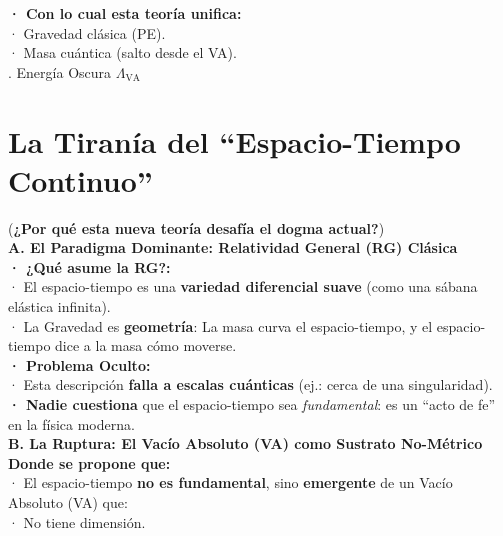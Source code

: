 \documentclass[a4paper]{article}
\theoremstyle{definition}
\theoremstyle{remark}
\numberwithin{equation}{section}
\begin{document}
	\textbf{· Con lo cual esta teoría unifica:}\\
	
	· Gravedad clásica (PE).\\
	
	· Masa cuántica (salto desde el VA).\\
	
	. Energía Oscura \(\Lambda_{\text{VA}}\)
	
	
	
	\section{La Tiranía del ``Espacio-Tiempo Continuo''}
	
	(\textbf{¿Por qué esta nueva teoría desafía el dogma actual?})\\
	
	\textbf{A. El Paradigma Dominante: Relatividad General (RG) Clásica}\\
	
	\textbf{· ¿Qué asume la RG?:}\\
	
	· El espacio-tiempo es una \textbf{variedad diferencial suave} (como una sábana elástica infinita).\\
	
	· La Gravedad es \textbf{geometría}: La masa curva el espacio-tiempo, y el espacio-tiempo dice a la masa cómo moverse.\\
	
	\textbf{· Problema Oculto:}\\
	
	· Esta descripción \textbf{falla a escalas cuánticas} (ej.: cerca de una singularidad).\\
	
	\textbf{· Nadie cuestiona} que el espacio-tiempo sea \textit{fundamental}: es un ``acto de fe'' en la física moderna.\\
	
	\textbf{B. La Ruptura: El Vacío Absoluto (VA) como Sustrato No-Métrico}\\
	
	\textbf{Donde se propone que:}\\
	
	· El espacio-tiempo \textbf{no es fundamental}, sino \textbf{emergente} de un Vacío Absoluto (VA) que:\\
	
	· No tiene dimensión.\\
	
\end{document}
